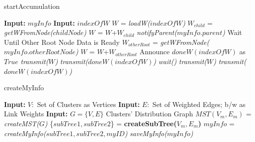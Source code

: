 \documentclass[12pt,notitlepage,oneside]{report}
\begin{document}
\begin{algorithm} [!htbp]
\caption{startAccumulation}
	\begin{algorithmic}[1]
	\label{accum}
	\STATE \textbf{Input:} $myInfo$
	\STATE \textbf{Input:} $indexOfW$
	\STATE $W$ = \textit{loadW($indexOfW$)} 
			\STATE  $W_{child}$ = \textit{getWFromNode($childNode$)}
			\STATE $W$ = $W$+$W_{child}$
		\ENDIF
	\ENDFOR
	\STATE \textit{notifyParent($myInfo.parent$)}
		\STATE Wait Until Other Root Node Data is Ready
		\STATE  $W_{otherRoot}$ = \textit{getWFromNode($myInfo.otherRootNode$)}
		\STATE $W$ = $W$+$W_{otherRoot}$
		\STATE Announce $doneW(indexOfW)$ as $True$
			\STATE \textit{transmit($W$)}
			\STATE \textit{transmit($doneW(indexOfW)$)}
		\ENDFOR
	\ELSE
			\STATE \textit{wait()}
		\ENDWHILE
			\STATE \textit{transmit($W$)}
			\STATE \textit{transmit($doneW(indexOfW)$)}
		\ENDFOR
	\ENDIF
	
	\end{algorithmic}
\end{algorithm}


\begin{algorithm}[!htbp]
	\caption{createMyInfo}
	\begin{algorithmic} [1]
	    \label{info}
	\STATE \textbf{Input: }$V: $ Set of Clusters as Vertices
	\STATE \textbf{Input: }$E: $ Set of Weighted Edges; b/w as Link Weights
	\STATE \textbf{Input: }$G=\{V,E\}$ Clusters' Distribution Graph
	\STATE $MST(V_m,E_m)$ = \textit{createMST($G$)}
	\STATE \{$subTree1, subTree2$\} = \textbf{createSubTree($V_m,E_m$)}
	\STATE $myInfo$ = \textit{createMyInfo($subTree1, subTree2, myID$)}
	\STATE \textit{saveMyInfo($myInfo$)}
	\end{algorithmic}
\end{algorithm}
\end{document}
